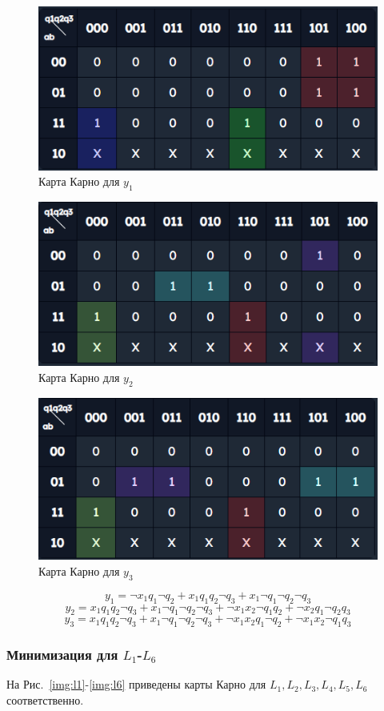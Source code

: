 \documentclass[a4paper, final]{article}
\begin{document}
\begin{figure}[H]
  \centering
  \includegraphics[width=0.7\linewidth]{y1.png}
  \caption{Карта Карно для $y_1$}
  \label{img:y1}
\end{figure}

\begin{figure}[H]
  \centering
  \includegraphics[width=0.7\linewidth]{y2.png}
  \caption{Карта Карно для $y_2$}
  \label{img:y2}
\end{figure}

\begin{figure}[H]
  \centering
  \includegraphics[width=0.7\linewidth]{y3.png}
  \caption{Карта Карно для $y_3$}
  \label{img:y3}
\end{figure}

\[y_1 = \neg x_1 q_1 \neg q_2 + x_1 q_1 q_2 \neg q_3 + x_1 \neg q_1 \neg q_2 \neg q_3\]
\[y_2 = x_1 q_1 q_2 \neg q_3 + x_1 \neg q_1 \neg q_2 \neg q_3 + \neg x_1 x_2 \neg q_1 q_2 + \neg  x_2 q_1 \neg q_2 q_3\]
\[y_3 = x_1 q_1 q_2 \neg q_3 + x_1 \neg q_1 \neg q_2 \neg q_3 + \neg x_1 x_2 q_1 \neg q_2 + \neg x_1 x_2 \neg q_1 q_3\]

\subsubsection{Минимизация для $L_1$-$L_6$}
На Рис.~\ref{img:l1}-\ref{img:l6} приведены карты Карно для $L_1, L_2, L_3, L_4, L_5, L_6$ соответственно.
\end{document}
